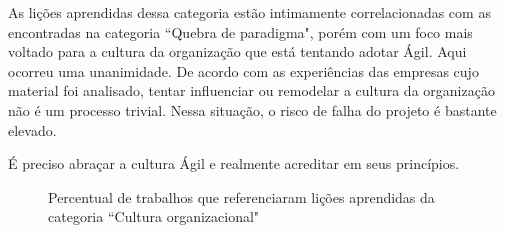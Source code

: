 As lições aprendidas dessa categoria estão intimamente correlacionadas com as encontradas na categoria ``Quebra de paradigma", porém com um foco mais voltado para a cultura da organização que está tentando adotar Ágil. Aqui ocorreu uma unanimidade. De acordo com as experiências das empresas cujo material foi analisado, tentar influenciar ou remodelar a cultura da organização não é um processo trivial. Nessa situação, o risco de falha do projeto é bastante elevado.

É preciso abraçar a cultura Ágil e realmente acreditar em seus princípios.

\begin{figure}[H]
	\centering
	\captionsetup{justification=centering}
	\caption{Percentual de trabalhos que referenciaram lições aprendidas da categoria ``Cultura organizacional"}
	\label{fig:cultura}
\end{figure}
